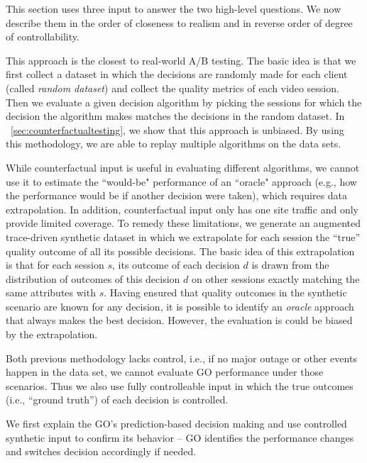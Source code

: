 This section uses three input to answer the two high-level questions. We now describe them in the order of closeness to realism and in reverse order of degree of controllability.

 This approach is the closest to real-world A/B testing. The basic idea is that we first collect a dataset in which the decisions are randomly made for each client (called {\it random dataset}) and collect the quality metrics of each video session. Then we evaluate a given decision algorithm by picking the sessions for which the decision the algorithm makes matches the decisions in the random dataset. In \Section~\ref{sec:counterfactualtesting}, we show that this approach is unbiased. 
By using this methodology, we are able to replay multiple algorithms on the data sets.

 While counterfactual input is useful in evaluating different algorithms, we cannot use it to estimate the ``would-be" performance of an ``oracle" approach (e.g., how the performance would be if another decision were taken), which requires data extrapolation. In addition, counterfactual input only has one site traffic and only provide limited coverage. To remedy these limitations, we generate an augmented trace-driven synthetic dataset in which we extrapolate for each session the ``true'' quality outcome of all its possible decisions. The basic idea of this extrapolation  is that for each session $s$, its outcome of each decision $d$ is drawn from the distribution of outcomes of this decision $d$ on other sessions exactly matching the same attributes with $s$. Having ensured that quality outcomes in the synthetic scenario are known for any decision, it is possible to identify an {\it oracle} approach that always makes the best decision. However, the evaluation is could be biased by the extrapolation.

 Both previous methodology lacks control, i.e., if no major outage or other events happen in the data set, we cannot evaluate GO performance under those scenarios. Thus we also use fully controlleable input in which the true outcomes (i.e., ``ground truth'') of each decision is controlled.





We first explain the GO's prediction-based decision making and use controlled synthetic input to confirm its behavior -- GO identifies the performance changes and switches decision accordingly if needed.

